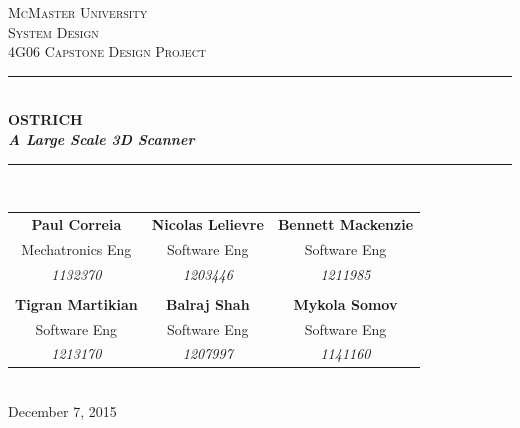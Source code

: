 \documentclass[10pt,letterpaper]{article}
\begin{document}
	
	
	\begin{titlepage}
		\newcommand{\HRule}{\rule{\linewidth}{0.5mm}}
		\center
		
		\textsc{\LARGE McMaster University}\\[1.5cm] %
		\textsc{\Large System Design}\\[0.5cm] %
		\textsc{\large 4G06 Capstone Design Project}\\[0.5cm] %
		
		\HRule \\[0.4cm] 
		{ \huge \bfseries OSTRICH \\[2mm] \textit{A Large Scale 3D Scanner}}\\[0.4cm] %
		\HRule \\[1.5cm]
		
		\begin{tabular}{ccc}
			\bf{Paul Correia}		& \bf{Nicolas Lelievre} 	& \bf{Bennett Mackenzie}		\\
			Mechatronics Eng 		& Software Eng 				& Software Eng 					\\
			\textit{1132370} 		& \textit{1203446}			& \textit{1211985} 				\\ \\
			\bf{Tigran Martikian} 	& \bf{Balraj Shah} 			& \bf{Mykola Somov} 			\\
			Software Eng			& Software Eng				& Software Eng 					\\
			\textit{1213170} 		& \textit{1207997}			& \textit{1141160}
		\end{tabular}\\[4cm]
		
		{\large December 7, 2015}\\[3cm] 
		
		
		\vfill %
		
	\end{titlepage}
	
    
\thispagestyle{empty}

\tableofcontents


\newpage


\thispagestyle{empty}

\listoffigures
\end{document}

